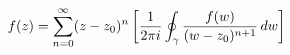 \documentclass[preview]{standalone}
\begin{document}
\begin{align*}
\special{dvisvgm:raw <g id='unique000'>}f(z) = \sum_{n=0}^{\infty} (z-z_0)^n \left[ \frac{1}{2\pi i} \oint_{\gamma} \frac{f(w)}{(w-z_0)^{n+1}}\, dw \right]\special{dvisvgm:raw </g>}
\end{align*}
\end{document}
